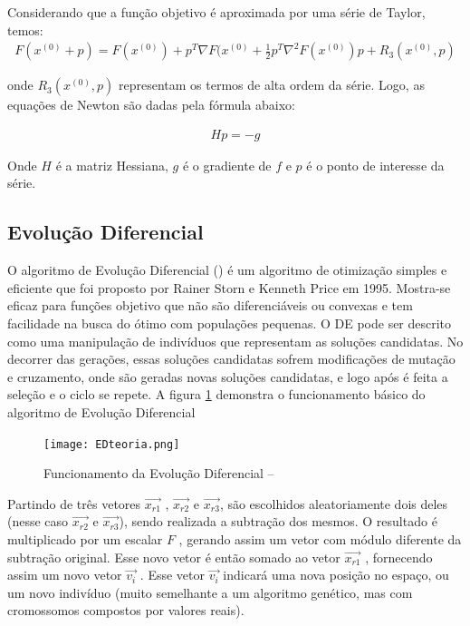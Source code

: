 \documentclass{article}
\begin{document}
Considerando que a função objetivo é aproximada por uma série de Taylor, temos:
\begin{equation}
\begin{split}
F(x^{(0)} + p) = F(x^{(0)}) + p^T \nabla F(x^{(0)} + \frac{1}{2} p^T \nabla^2 F(x^{(0)}) p + R_3 (x^{(0)}, p)
\end{split}
\end{equation}

onde $R_3(x^{(0)}, p)$ representam os termos de alta ordem da série. Logo, as equações de Newton são dadas pela fórmula abaixo:

\begin{equation}
\begin{split}
Hp = -g
\end{split}
\end{equation}

Onde $H$ é a matriz Hessiana, $g$ é o gradiente de $f$ e $p$  é o ponto de interesse da série.
\subsection{Evolução Diferencial}
O algoritmo de Evolução Diferencial (\cite{storn1997differential}) é um algoritmo de otimização simples e eficiente que foi proposto por Rainer Storn e Kenneth Price em 1995. Mostra-se eficaz para funções objetivo que não são diferenciáveis ou convexas e tem facilidade na busca do ótimo com populações pequenas.
O DE pode ser descrito como uma manipulação de indivíduos que representam as soluções candidatas. No decorrer das gerações, essas soluções candidatas sofrem modificações de mutação e cruzamento, onde são geradas novas soluções candidatas, e logo após é feita a seleção e o ciclo se repete. A figura \ref{fig:EDTeoria} demonstra o funcionamento básico do algoritmo de Evolução Diferencial

\begin{figure}[H]
  \centering
  \texttt{[image: EDteoria.png]}
  \caption{Funcionamento da Evolução Diferencial -- \cite{storn1997differential}}
  \label{fig:EDTeoria}
\end{figure}%


Partindo de três vetores $\overrightarrow{x_{r1}}$ , $\overrightarrow{x_{r2}}$ e $\overrightarrow{x_{r3}}$, são escolhidos
aleatoriamente dois deles (nesse caso $\overrightarrow{x_{r2}}$ e $\overrightarrow{x_{r3}}$), sendo realizada a subtração dos mesmos. O resultado é 
multiplicado por um escalar $F$ , gerando assim um vetor com módulo diferente da subtração original. Esse novo vetor 
é então somado ao vetor $\overrightarrow{x_{r1}}$ , fornecendo assim um novo vetor $\overrightarrow{v_i}$ . Esse vetor $\overrightarrow{v_i}$ indicará uma nova posição 
no espaço, ou um novo indivíduo (muito semelhante a um algoritmo genético, mas com cromossomos compostos por valores 
reais).
\end{document}
